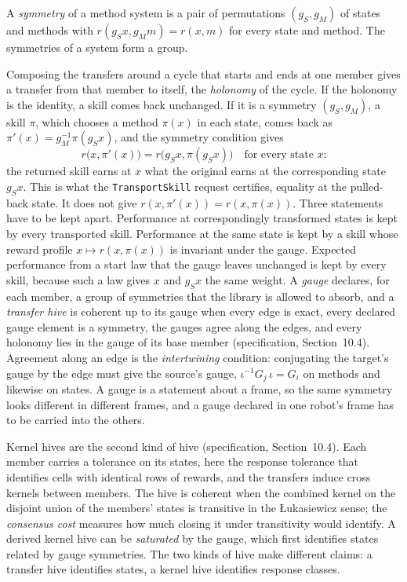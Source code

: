 \documentclass[11pt]{article}
\newcommand{\code}[1]{\texttt{#1}}
\newcommand{\spec}[1]{specification, Section~#1}
\theoremstyle{definition}
\theoremstyle{plain}
\begin{document}
A \emph{symmetry} of a method system is a pair of permutations $(g_S,g_M)$ of states and methods
with $r(g_Sx,g_Mm)=r(x,m)$ for every state and method. The symmetries of a system form a group.

Composing the transfers around a cycle that starts and ends at one member gives a transfer from that
member to itself, the \emph{holonomy} of the cycle. If the holonomy is the identity, a skill comes
back unchanged. If it is a symmetry $(g_S,g_M)$, a skill $\pi$, which chooses a method $\pi(x)$ in
each state, comes back as $\pi'(x)=g_M^{-1}\pi(g_Sx)$, and the symmetry condition gives
\[
r\bigl(x,\pi'(x)\bigr)=r\bigl(g_Sx,\pi(g_Sx)\bigr)\quad\text{for every state $x$:}
\]
the returned skill earns at $x$ what the original earns at the corresponding state $g_Sx$. This is
what the \code{TransportSkill} request certifies, equality at the pulled-back state. It does not give
$r(x,\pi'(x))=r(x,\pi(x))$. Three statements have to be kept apart. Performance at correspondingly
transformed states is kept by every transported skill. Performance at the same state is kept by a
skill whose reward profile $x\mapsto r(x,\pi(x))$ is invariant under the gauge. Expected performance
from a start law that the gauge leaves unchanged is kept by every skill, because such a law gives
$x$ and $g_Sx$ the same weight. A \emph{gauge} declares, for each member, a group of symmetries that the library is allowed to absorb,
and a \emph{transfer hive} is coherent up to its gauge when every edge is exact, every declared
gauge element is a symmetry, the gauges agree along the edges, and every holonomy lies in the gauge
of its base member (\spec{10.4}). Agreement along an edge is the \emph{intertwining} condition:
conjugating the target's gauge by the edge must give the source's gauge,
$\iota^{-1}G_j\,\iota=G_i$ on methods and likewise on states. A gauge is a statement about a frame,
so the same symmetry looks different in different frames, and a gauge declared in one robot's frame
has to be carried into the others.

Kernel hives are the second kind of hive (\spec{10.4}). Each member carries a tolerance on its
states, here the response tolerance that identifies cells with identical rows of rewards, and the
transfers induce cross kernels between members. The hive is coherent when the combined kernel on the
disjoint union of the members' states is transitive in the \L{}ukasiewicz sense; the
\emph{consensus cost} measures how much closing it under transitivity would identify. A derived
kernel hive can be \emph{saturated} by the gauge, which first identifies states related by gauge
symmetries. The two kinds of hive make different claims: a transfer hive identifies states, a
kernel hive identifies response classes.
\end{document}
